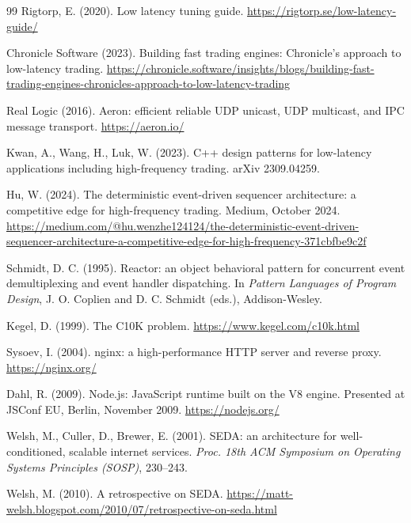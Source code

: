\documentclass[11pt]{article}
\begin{document}
\begin{thebibliography}{99}
Rigtorp, E. (2020). Low latency tuning guide. \url{https://rigtorp.se/low-latency-guide/}

Chronicle Software (2023). Building fast trading engines: Chronicle's approach to
low-latency trading.
\url{https://chronicle.software/insights/blogs/building-fast-trading-engines-chronicles-approach-to-low-latency-trading}

Real Logic (2016). Aeron: efficient reliable UDP unicast, UDP multicast, and IPC message
transport. \url{https://aeron.io/}

Kwan, A., Wang, H., Luk, W. (2023). C++ design patterns for low-latency applications
including high-frequency trading. arXiv 2309.04259.

Hu, W. (2024). The deterministic event-driven sequencer architecture: a competitive edge
for high-frequency trading. Medium, October 2024.
\url{https://medium.com/@hu.wenzhe124124/the-deterministic-event-driven-sequencer-architecture-a-competitive-edge-for-high-frequency-371cbfbe9c2f}

Schmidt, D. C. (1995). Reactor: an object behavioral pattern for concurrent event
demultiplexing and event handler dispatching. In \textit{Pattern Languages of Program
Design}, J. O. Coplien and D. C. Schmidt (eds.), Addison-Wesley.

Kegel, D. (1999). The C10K problem. \url{https://www.kegel.com/c10k.html}

Sysoev, I. (2004). nginx: a high-performance HTTP server and reverse proxy.
\url{https://nginx.org/}

Dahl, R. (2009). Node.js: JavaScript runtime built on the V8 engine. Presented at JSConf
EU, Berlin, November 2009. \url{https://nodejs.org/}

Welsh, M., Culler, D., Brewer, E. (2001). SEDA: an architecture for well-conditioned,
scalable internet services. \textit{Proc. 18th ACM Symposium on Operating Systems
Principles (SOSP)}, 230--243.

Welsh, M. (2010). A retrospective on SEDA.
\url{https://matt-welsh.blogspot.com/2010/07/retrospective-on-seda.html}


\end{thebibliography}
\end{document}
